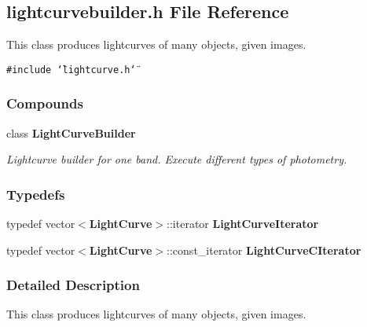 \subsection{lightcurvebuilder.h File Reference}
\label{lightcurvebuilder_h}
This class produces lightcurves of many objects, given images. 


{\tt \#include \char`\"{}lightcurve.h\char`\"{}}\par
\subsubsection*{Compounds}
\begin{CompactItemize}
\item 
class {\bf Light\-Curve\-Builder}
\begin{CompactList}\small\item\em Lightcurve builder for one band. Execute different types of photometry.\item\end{CompactList}\end{CompactItemize}
\subsubsection*{Typedefs}
\begin{CompactItemize}
\item 
{}
typedef vector$<${\bf Light\-Curve}$>$::iterator {\bf Light\-Curve\-Iterator}\label{lightcurvebuilder_h_a0}

\item 
{}
typedef vector$<${\bf Light\-Curve}$>$::const\_\-iterator {\bf Light\-Curve\-CIterator}\label{lightcurvebuilder_h_a1}

\end{CompactItemize}


\subsubsection{Detailed Description}
This class produces lightcurves of many objects, given images.



